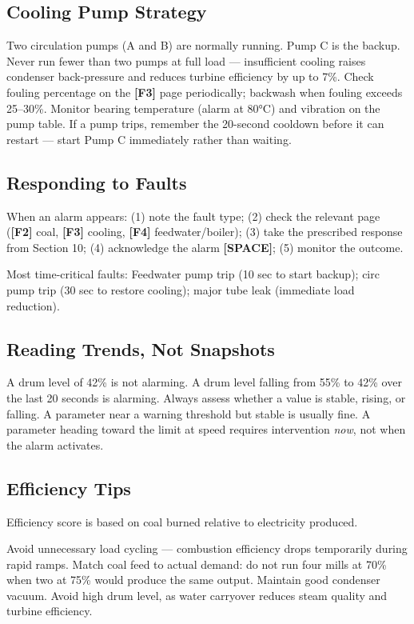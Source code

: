 \documentclass[10pt,a5paper]{article}
\newcommand{\key}[1]{\textbf{[#1]}}
\begin{document}
\subsection{Cooling Pump Strategy}

Two circulation pumps (A and B) are normally running. Pump C is the backup.
Never run fewer than two pumps at full load --- insufficient cooling raises
condenser back-pressure and reduces turbine efficiency by up to 7\%. Check fouling
percentage on the \key{F3} page periodically; backwash when fouling exceeds
25--30\%. Monitor bearing temperature (alarm at 80°C) and vibration on the pump
table. If a pump trips, remember the 20-second cooldown before it can restart ---
start Pump C immediately rather than waiting.

\subsection{Responding to Faults}

When an alarm appears: (1) note the fault type; (2) check the relevant page
(\key{F2} coal, \key{F3} cooling, \key{F4} feedwater/boiler); (3) take the
prescribed response from Section 10; (4) acknowledge the alarm \key{SPACE};
(5) monitor the outcome.

Most time-critical faults: Feedwater pump trip (10 sec to start backup);
circ pump trip (30 sec to restore cooling); major tube leak (immediate load
reduction).

\subsection{Reading Trends, Not Snapshots}

A drum level of 42\% is not alarming. A drum level falling from 55\% to 42\%
over the last 20 seconds is alarming. Always assess whether a value is stable,
rising, or falling. A parameter near a warning threshold but stable is usually
fine. A parameter heading toward the limit at speed requires intervention
\textit{now}, not when the alarm activates.

\subsection{Efficiency Tips}

Efficiency score is based on coal burned relative to electricity produced.

Avoid unnecessary load cycling --- combustion efficiency drops temporarily
during rapid ramps. Match coal feed to actual demand: do not run four mills
at 70\% when two at 75\% would produce the same output. Maintain good
condenser vacuum. Avoid high drum level, as water carryover reduces steam
quality and turbine efficiency.
\end{document}
